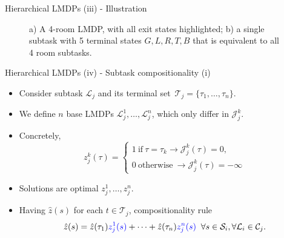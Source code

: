 \documentclass{beamer}
\theoremstyle{mystyle}
\newcommand{\cC}{\mathcal{C}}
\newcommand{\cJ}{\mathcal{J}}
\newcommand{\cL}{\mathcal{L}}
\newcommand{\cS}{\mathcal{S}}
\newcommand{\cT}{\mathcal{T}}
\begin{document}
\begin{frame}{Hierarchical LMDPs (iii) - Illustration}
\begin{figure}
\begin{center}
        \end{center}
        \caption{a) A 4-room LMDP, with all exit states highlighted; b) a single subtask with 5 terminal states $G,L,R,T,B$ that is equivalent to all 4 room subtasks.}
    \end{figure}

\end{frame}

\begin{frame}{Hierarchical LMDPs (iv) - Subtask compositionality (i)}

    \begin{itemize}
        \item Consider subtask $\cL_j$ and its terminal set~$\cT_j=\{\tau_1,\ldots,\tau_n\}$.
        \item We define {\color{blue} $n$ base LMDPs $\cL_j^1,\ldots,\cL_j^n$}, which only differ in $\cJ_j^k$.
        \item Concretely,
              \[
                  z_j^k(\tau)=\begin{cases}
                      1 \ \text{if} \ \tau=\tau_k \rightarrow \cJ_j^k(\tau)=0, \\
                      0 \ \text{otherwise} \ \rightarrow \cJ_j^k(\tau)=-\infty
                  \end{cases}
              \]
        \item Solutions are {\color{blue} optimal $z_j^1,\ldots,z_j^n$.}
        \item Having $\hat z(s)$ for each $t \in \cT_j$, {\color{blue}compositionality rule}
              \begin{equation*}
                  \hat{z}(s)=\hat{z}(\tau_1){\color{blue} z_j^1(s)}+\cdots+\hat{z}(\tau_n){\color{blue} z_j^n(s)} \;\; \forall s\in\cS_i,\forall\cL_i\in\cC_j.
              \end{equation*}
    \end{itemize}


\end{frame}
\end{document}

